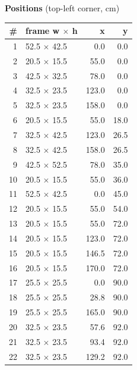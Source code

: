 \documentclass[a4paper,landscape,10pt]{article}
\begin{document}
\begin{minipage}[t]{0.25\textwidth}
\vspace{8pt}
{\bfseries Positions} (top-left corner, cm)\\[2pt]
\tiny
\begin{tabular}{@{}r l r r@{}}
\toprule
\# & frame w $\times$ h & x & y \\
\midrule
1 & 52.5 $\times$ 42.5 & 0.0 & 0.0 \\
2 & 20.5 $\times$ 15.5 & 55.0 & 0.0 \\
3 & 42.5 $\times$ 32.5 & 78.0 & 0.0 \\
4 & 32.5 $\times$ 23.5 & 123.0 & 0.0 \\
5 & 32.5 $\times$ 23.5 & 158.0 & 0.0 \\
6 & 20.5 $\times$ 15.5 & 55.0 & 18.0 \\
7 & 32.5 $\times$ 42.5 & 123.0 & 26.5 \\
8 & 32.5 $\times$ 42.5 & 158.0 & 26.5 \\
9 & 42.5 $\times$ 52.5 & 78.0 & 35.0 \\
10 & 20.5 $\times$ 15.5 & 55.0 & 36.0 \\
11 & 52.5 $\times$ 42.5 & 0.0 & 45.0 \\
12 & 20.5 $\times$ 15.5 & 55.0 & 54.0 \\
13 & 20.5 $\times$ 15.5 & 55.0 & 72.0 \\
14 & 20.5 $\times$ 15.5 & 123.0 & 72.0 \\
15 & 20.5 $\times$ 15.5 & 146.5 & 72.0 \\
16 & 20.5 $\times$ 15.5 & 170.0 & 72.0 \\
17 & 25.5 $\times$ 25.5 & 0.0 & 90.0 \\
18 & 25.5 $\times$ 25.5 & 28.8 & 90.0 \\
19 & 25.5 $\times$ 25.5 & 165.0 & 90.0 \\
20 & 32.5 $\times$ 23.5 & 57.6 & 92.0 \\
21 & 32.5 $\times$ 23.5 & 93.4 & 92.0 \\
22 & 32.5 $\times$ 23.5 & 129.2 & 92.0 \\
\bottomrule
\end{tabular}
\end{minipage}
\clearpage
\end{document}
